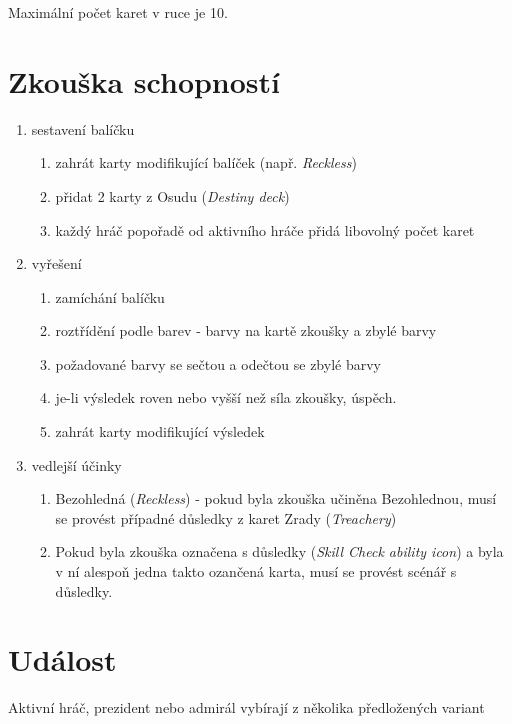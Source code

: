 \documentclass[a4paper,twocolumn]{article}
\begin{document}
Maximální počet karet v ruce je 10.\\

\section{Zkouška schopností}
\begin{enumerate}
\item sestavení balíčku
	\begin{enumerate}
 	\item zahrát karty modifikující balíček (např. \emph{Reckless})
	\item přidat 2 karty z Osudu (\emph{Destiny deck})
	\item každý hráč popořadě od aktivního hráče přidá libovolný počet karet
	\end{enumerate}
\item vyřešení 
	\begin{enumerate}
	\item zamíchání balíčku
	\item roztřídění podle barev - barvy na kartě zkoušky a zbylé barvy
	\item požadované barvy se sečtou a odečtou se zbylé barvy
	\item je-li výsledek roven nebo vyšší než síla zkoušky, úspěch.
	\item zahrát karty modifikující výsledek
	\end{enumerate}
\item vedlejší účinky
	\begin{enumerate}
	\item Bezohledná (\emph{Reckless}) - pokud byla zkouška učiněna Bezohlednou, musí se provést případné důsledky z karet Zrady (\emph{Treachery})
	\item Pokud byla zkouška označena s důsledky (\emph{Skill Check ability icon}) a byla v ní alespoň jedna takto ozančená karta, musí se provést scénář s důsledky.
	\end{enumerate}
\end{enumerate}

\section{Událost}
Aktivní hráč, prezident nebo admirál vybírají z několika předložených variant
\end{document}
